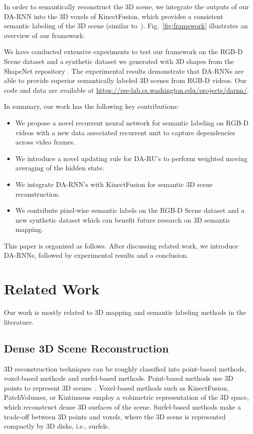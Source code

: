 \documentclass[conference]{IEEEtran}
\begin{document}
In order to semantically reconstruct the 3D scene, we integrate the outputs of our DA-RNN into the 3D voxels of KinectFusion, which provides a consistent semantic labeling of the 3D scene (similar to~\cite{lai2014unsupervised,mccormac2016semanticfusion}). Fig.~\ref{fig:framework} illustrates an overview of our framework.  

We have conducted extensive experiments to test our framework on the RGB-D Scene dataset \cite{lai2014unsupervised} and a synthetic dataset we generated with 3D shapes from the ShapeNet repository \cite{chang2015shapenet}. The experimental results demonstrate that DA-RNNs are able to provide superior semantically labeled 3D scenes from RGB-D videos. Our code and data are available at \url{https://rse-lab.cs.washington.edu/projects/darnn/}.

In summary, our work has the following key contributions:
\begin{itemize}	
	\item We propose a novel recurrent neural network for semantic labeling on RGB-D videos with a new data associated recurrent unit to capture dependencies across video frames.
	\item We introduce a novel updating rule for DA-RU's to perform weighted moving averaging of the hidden state. 
	\item We integrate DA-RNN's with KinectFusion for semantic 3D scene reconstruction.
	\item We contribute pixel-wise semantic labels on the RGB-D Scene dataset \cite{lai2014unsupervised} and a new synthetic dataset which can benefit future research on 3D semantic mapping.
\end{itemize} 

This paper is organized as follows. After discussing related work, we introduce DA-RNNs, followed by experimental results and a conclusion.

\section{Related Work}

Our work is mostly related to 3D mapping and semantic labeling methods in the literature.

\subsection{Dense 3D Scene Reconstruction}

3D reconstruction techniques can be roughly classified into point-based methods, voxel-based methods and surfel-based methods. Point-based methods use 3D points to represent  3D scenes~\cite{snavely2008skeletal,crandall2011discrete,henry2012rgb}. Voxel-based methods such as KinectFusion, PatchVolumes, or Kintinuous \cite{newcombe2011kinectfusion,henry2013patch,Whe12Kin} employ a volumetric representation of the 3D space, which reconstruct dense 3D surfaces of the scene. Surfel-based methods \cite{keller2013real,henry2012rgb,whelan2015elasticfusion} make a trade-off between 3D points and voxels, where the 3D scene is represented compactly by 3D disks, i.e., surfels.
\end{document}
